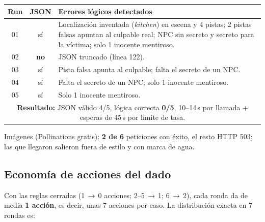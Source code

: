 \documentclass[11pt,a4paper]{article}
\begin{document}
\begin{center}
\renewcommand{\arraystretch}{1.15}
\begin{tabularx}{\linewidth}{c c X}
\toprule
\textbf{Run} & \textbf{JSON} & \textbf{Errores lógicos detectados} \\
\midrule
01 & sí & Localización inventada (\emph{kitchen}) en escena y 4 pistas; 2 pistas falsas apuntan al
culpable real; NPC sin secreto y secreto para la víctima; solo 1 inocente mentiroso. \\
02 & \textbf{no} & JSON truncado (línea 122). \\
03 & sí & Pista falsa apunta al culpable; falta el secreto de un NPC. \\
04 & sí & Falta el secreto de un NPC; solo 1 inocente mentiroso. \\
05 & sí & Solo 1 inocente mentiroso. \\
\midrule
\multicolumn{3}{p{0.94\linewidth}}{\textbf{Resultado:} JSON válido 4/5, lógica correcta \textbf{0/5}, 10--14\,s por
llamada + esperas de 45\,s por límite de tasa.} \\
\bottomrule
\end{tabularx}
\end{center}

Imágenes (Pollinations gratis): \textbf{2 de 6} peticiones con éxito, el resto HTTP 503; las que
llegaron salieron fuera de estilo y con marca de agua.

\subsection{Economía de acciones del dado}

Con las reglas cerradas (1\,$\to$\,0 acciones; 2--5\,$\to$\,1; 6\,$\to$\,2), cada ronda da de media
\textbf{1 acción}, es decir, unas 7 acciones por caso. La distribución exacta en 7 rondas es:

\begin{center}
\end{center}
\end{document}
